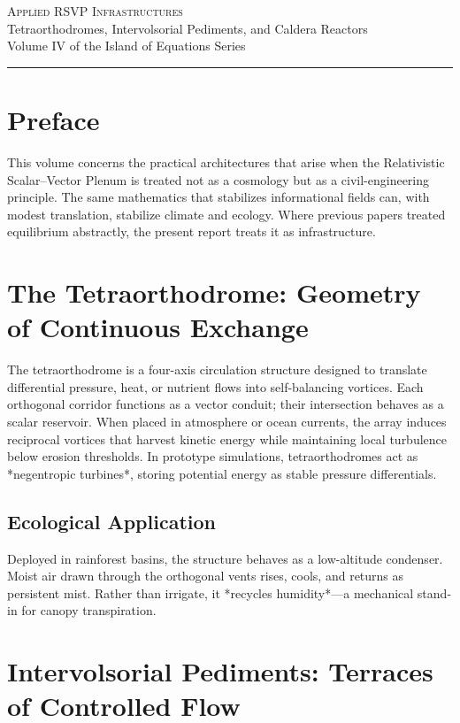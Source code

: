 \documentclass[12pt]{article}
\begin{document}
\begin{center}
{\Large\textsc{Applied RSVP Infrastructures}}\\[1ex]
{\small Tetraorthodromes, Intervolsorial Pediments, and Caldera Reactors}\\[1ex]
{\small Volume IV of the Island of Equations Series}\\[2ex]
{\rule{0.4\textwidth}{0.4pt}}
\end{center}

\section*{Preface}

This volume concerns the practical architectures that arise when the
Relativistic Scalar–Vector Plenum is treated not as a cosmology but as a
civil-engineering principle.
The same mathematics that stabilizes informational fields can, with modest translation,
stabilize climate and ecology.
Where previous papers treated equilibrium abstractly, the present report treats it as infrastructure.

\section{The Tetraorthodrome: Geometry of Continuous Exchange}

The tetraorthodrome is a four-axis circulation structure designed to
translate differential pressure, heat, or nutrient flows into
self-balancing vortices.
Each orthogonal corridor functions as a vector conduit; their intersection behaves as a scalar reservoir.
When placed in atmosphere or ocean currents, the array induces
reciprocal vortices that
harvest kinetic energy while maintaining local turbulence below erosion thresholds.
In prototype simulations, tetraorthodromes act as *negentropic turbines*,
storing potential energy as stable pressure differentials.

\subsection*{Ecological Application}
Deployed in rainforest basins, the structure behaves as a low-altitude condenser.
Moist air drawn through the orthogonal vents rises, cools, and returns as persistent mist.
Rather than irrigate, it *recycles humidity*—a mechanical stand-in for canopy transpiration.

\section{Intervolsorial Pediments: Terraces of Controlled Flow}
\end{document}
